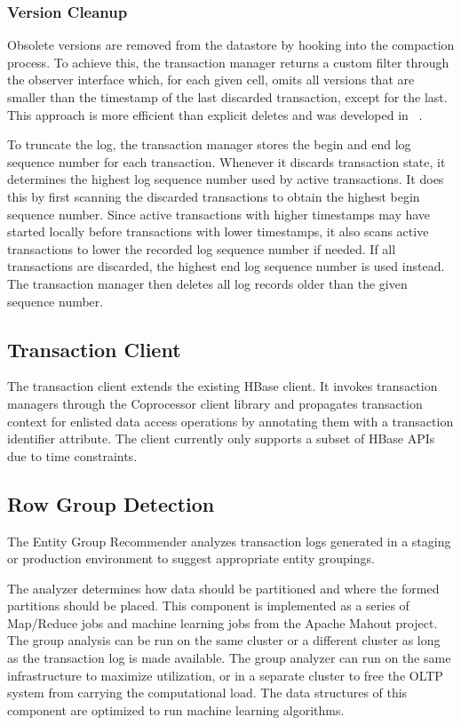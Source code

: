 \documentclass[10pt,final,journal]{IEEEtran}
\begin{document}
 \subsubsection{Version Cleanup}
Obsolete versions are removed from the datastore by hooking into the compaction process. To achieve this, the transaction manager returns a custom filter through the observer interface which, for each given cell, omits all versions that are smaller than the timestamp of the last discarded transaction, except for the last. This approach is more efficient than explicit deletes and was developed in ~\cite{Junqueira:2011:LTS:2056318.2057148}.

To truncate the log, the transaction manager stores the begin and end log sequence number for each transaction. Whenever it discards transaction state, it determines the highest log sequence number used by active transactions. It does this by first scanning the discarded transactions to obtain the highest begin sequence number. Since active transactions with higher timestamps may have started locally before transactions with lower timestamps, it also scans active transactions to lower the recorded log sequence number if needed. If all transactions are discarded, the highest end log sequence number is used instead. The transaction manager then deletes all log records older than the given sequence number.

\subsection{Transaction Client}
The transaction client extends the existing HBase client. It invokes transaction managers through the Coprocessor client library and propagates transaction context for enlisted data access operations by annotating them with a transaction identifier attribute. The client currently only supports a subset of HBase APIs due to time constraints.

\subsection{Row Group Detection}
The Entity Group Recommender analyzes transaction logs generated in a staging or production environment to suggest appropriate entity groupings.

The analyzer determines how data should be partitioned and where the formed partitions should be placed. This component is implemented as a series of Map/Reduce jobs and machine learning jobs from the Apache Mahout project.  The group analysis can be run on the same cluster or a different cluster as long as the transaction log is made available. The group analyzer can run on the same infrastructure to maximize utilization, or in a separate cluster to free the OLTP system from carrying the computational load.  The data structures of this component are optimized to run machine learning algorithms.
\end{document}
